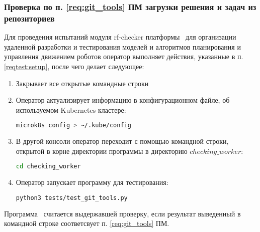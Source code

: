 \subsubsection{Проверка по п. \ref{req:git_tools} ПМ загрузки решения и задач из репозиториев} \label{reqtest:git_tools}
Для проведения испытаний модуля rf-checker платформы \productname\ для организации удаленной разработки и тестирования моделей и алгоритмов планирования и управления движением роботов оператор выполняет действия, указанные в п. \ref{reqtest:setup}, после чего делает следующее:
\begin{enumerate}
    \item Закрывает все открытые командные строки
    \item Оператор актуализирует информацию в конфигурационном файле, об используемом Kubernetes кластере:
    \begin{lstlisting}[language=bash, numbers=none, frame=single]
        microk8s config > ~/.kube/config
    \end{lstlisting}
    \item В другой консоли оператор переходит с помощью командной строки, открытой в корне директории программы в директорию $checking\_worker$:
    \begin{lstlisting}[language=bash, numbers=none, frame=single]
    cd checking_worker
    \end{lstlisting}
    \item Оператор запускает программу для тестирования:
    \begin{lstlisting}[language=bash, numbers=none, frame=single]
    python3 tests/test_git_tools.py
    \end{lstlisting}
\end{enumerate}
Программа \programname\ считается выдержавшей проверку, если результат выведенный в командной строке соответсвует п. \ref{req:git_tools} ПМ.

